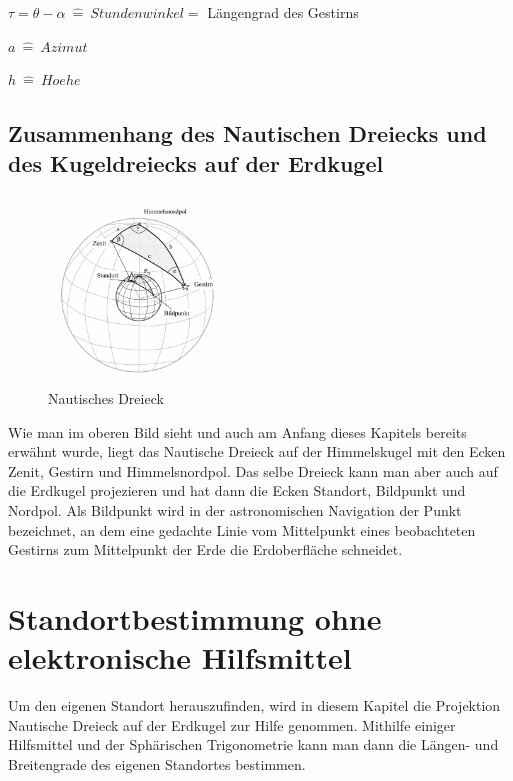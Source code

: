 $\tau = \theta-\alpha \ \widehat{=} \ Stundenwinkel =$ Längengrad des Gestirns 

$a \ \widehat{=} \ Azimut $

$h \ \widehat{=} \ Hoehe$


\newpage
\subsection{Zusammenhang des Nautischen Dreiecks und des Kugeldreiecks auf der Erdkugel}
\begin{figure}[h]
	\begin{center}
		\includegraphics[height=5cm,width=5cm]{papers/nav/bilder/kugel3.png}
		\caption[Nautisches Dreieck]{Nautisches Dreieck}
	\end{center}
\end{figure}

Wie man im oberen Bild sieht und auch am Anfang dieses Kapitels bereits erwähnt wurde, liegt das Nautische Dreieck auf der Himmelskugel mit den Ecken Zenit, Gestirn und Himmelsnordpol. 
Das selbe Dreieck kann man aber auch auf die Erdkugel projezieren und hat dann die Ecken Standort, Bildpunkt und Nordpol. 
Als Bildpunkt wird in der astronomischen Navigation der Punkt bezeichnet, an dem eine gedachte Linie vom Mittelpunkt eines beobachteten Gestirns zum Mittelpunkt der Erde die Erdoberfläche schneidet.


\section{Standortbestimmung ohne elektronische Hilfsmittel}
Um den eigenen Standort herauszufinden, wird in diesem Kapitel die Projektion Nautische Dreieck auf der Erdkugel zur Hilfe genommen. 
Mithilfe einiger Hilfsmittel und der Sphärischen Trigonometrie kann man dann die Längen- und Breitengrade des eigenen Standortes bestimmen.

